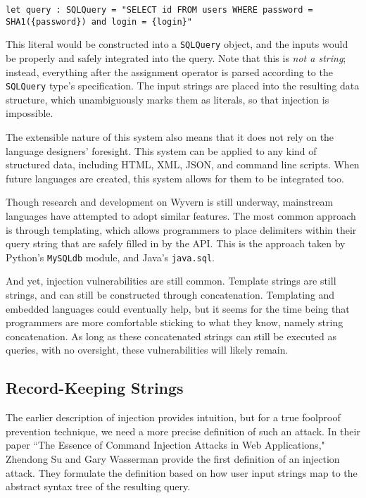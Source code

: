 \documentclass[twocolumn]{article}
\begin{document}
\begin{lstlisting}[language=Wyvern, frame=single]
let query : SQLQuery = "SELECT id FROM users WHERE password = SHA1({password}) and login = {login}"
\end{lstlisting}

This literal would be constructed into a \verb;SQLQuery; object, and the inputs would be properly and safely integrated into the query.  Note that this is \emph{not a string}; instead, everything after the assignment operator is parsed according to the \verb;SQLQuery; type's specification.  The input strings are placed into the resulting data structure, which unambiguously marks them as literals, so that injection is impossible.\cite{wyvern-short}

The extensible nature of this system also means that it does not rely on the language designers' foresight.  This system can be applied to any kind of structured data, including HTML, XML, JSON, and command line scripts.  When future languages are created, this system allows for them to be integrated too.\cite{wyvern-long}

Though research and development on Wyvern is still underway, mainstream languages have attempted to adopt similar features.  The most common approach is through templating, which allows programmers to place delimiters within their query string that are safely filled in by the API.  This is the approach taken by Python's \verb;MySQLdb; module, and Java's \verb;java.sql;.

And yet, injection vulnerabilities are still common.  Template strings are still strings, and can still be constructed through concatenation.  Templating and embedded languages could eventually help, but it seems for the time being that programmers are more comfortable sticking to what they know, namely string concatenation.  As long as these concatenated strings can still be executed as queries, with no oversight, these vulnerabilities will likely remain.

\subsection{Record-Keeping Strings}
The earlier description of injection provides intuition, but for a true foolproof prevention technique, we need a more precise definition of such an attack.  In their paper ``The Essence of Command Injection Attacks in Web Applications," Zhendong Su and Gary Wasserman provide the first definition of an injection attack.  They formulate the definition based on how user input strings map to the abstract syntax tree of the resulting query.\cite{su2006}
\end{document}
